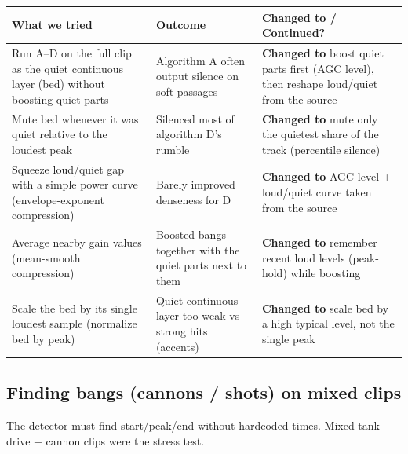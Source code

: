 \documentclass[11pt,a4paper]{article}
\begin{document}
\begin{center}
\small
\begin{tabularx}{\textwidth}{@{}>{\raggedright\arraybackslash}p{4cm}>{\raggedright\arraybackslash}p{4cm}>{\raggedright\arraybackslash}X@{}}
\toprule
\textbf{What we tried} & \textbf{Outcome} & \textbf{Changed to / Continued?} \\
\midrule
Run A--D on the full clip as the quiet continuous layer (bed) without boosting quiet parts & Algorithm A often output silence on soft passages & \textbf{Changed to} boost quiet parts first (AGC level), then reshape loud/quiet from the source \\
\addlinespace
Mute bed whenever it was quiet relative to the loudest peak & Silenced most of algorithm D's rumble & \textbf{Changed to} mute only the quietest share of the track (percentile silence) \\
\addlinespace
Squeeze loud/quiet gap with a simple power curve (envelope-exponent compression) & Barely improved denseness for D & \textbf{Changed to} AGC level + loud/quiet curve taken from the source \\
\addlinespace
Average nearby gain values (mean-smooth compression) & Boosted bangs together with the quiet parts next to them & \textbf{Changed to} remember recent loud levels (peak-hold) while boosting \\
\addlinespace
Scale the bed by its single loudest sample (normalize bed by peak) & Quiet continuous layer too weak vs strong hits (accents) & \textbf{Changed to} scale bed by a high typical level, not the single peak \\
\bottomrule
\end{tabularx}
\end{center}

\subsection*{Finding bangs (cannons / shots) on mixed clips}
The detector must find start/peak/end without hardcoded times. Mixed tank-drive + cannon clips were the stress test.
\end{document}
